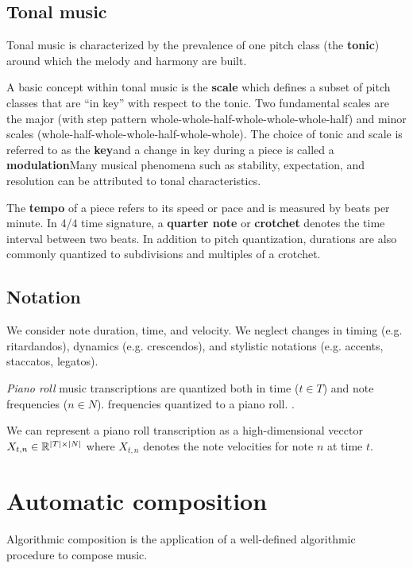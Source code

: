 \subsection{Tonal music}

Tonal music is characterized by the prevalence of one pitch class (the
\textbf{tonic}) around which the melody and harmony are built. 

A basic concept
within tonal music is the \textbf{scale} which defines a subset of pitch
classes that are ``in key'' with respect to the tonic. Two fundamental scales
are the major (with step pattern whole-whole-half-whole-whole-whole-half) and
minor scales (whole-half-whole-whole-half-whole-whole). The choice of tonic and
scale is referred to as the \textbf{key}and a change in key during a piece is
called a \textbf{modulation}Many musical phenomena such as stability,
expectation, and resolution can be attributed to tonal characteristics.

The \textbf{tempo} of a piece refers to its speed or pace and is measured by
beats per minute. In 4/4 time signature, a \textbf{quarter note} or
\textbf{crotchet} denotes the time interval between two beats. In addition to
pitch quantization, durations are also commonly quantized to subdivisions and
multiples of a crotchet.

\subsection{Notation}

We consider note duration, time, and velocity. We neglect changes in timing
(e.g. ritardandos), dynamics (e.g. crescendos), and stylistic notations (e.g.
accents, staccatos, legatos).

\emph{Piano roll} music transcriptions are quantized both in time ($t \in T$)
and note frequencies ($n \in N$). frequencies quantized to a piano roll.
.

We can represent a piano roll transcription as a high-dimensional vecctor
$X_{t,n} \in \mathbb{R}^{|T| \times |N|}$ where $X_{t,n}$ denotes the note
velocities for note $n$ at time $t$.

\section{Automatic composition}

Algorithmic composition is the application of a well-defined algorithmic
procedure to compose music.

